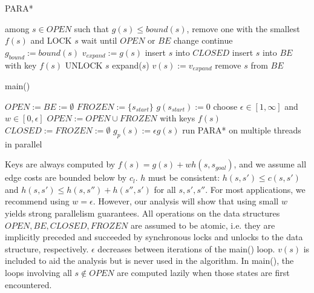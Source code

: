 \documentclass[letterpaper]{article}
\begin{document}
\begin{algorithm}
\caption{PARA*}
\label{alg:PARA*}
\begin{algorithmic}
\STATE among $s\in OPEN$ such that $g(s) \le bound(s)$, remove one with the smallest $f(s)$ and LOCK $s$
\STATE wait until $OPEN$ or $BE$ change
\STATE continue
\ENDIF
\STATE $g_{bound} := bound(s)$
\STATE $v_{expand} := g(s)$
\STATE insert $s$ into $CLOSED$
\STATE insert $s$ into $BE$ with key $f(s)$
\STATE UNLOCK $s$
\STATE expand($s$)
\STATE $v(s) := v_{expand}$
\STATE remove $s$ from $BE$
\ENDWHILE
\end{algorithmic}
\end{algorithm}

\begin{algorithm}
\caption{main()}
\label{alg:main}
\begin{algorithmic}
\STATE $OPEN := BE := \emptyset$
\STATE $FROZEN := \{s_{start}\}$
\STATE $g(s_{start}) := 0$
\REPEAT
\STATE choose $\epsilon \in [1,\infty]$ and $w \in [0,\epsilon]$
\STATE $OPEN := OPEN \cup FROZEN$ with keys $f(s)$
\STATE $CLOSED := FROZEN := \emptyset$
\STATE $g_p(s) := \epsilon g(s)$
\ENDFOR
\STATE run PARA* on multiple threads in parallel
\end{algorithmic}
\end{algorithm}

Keys are always computed by $f(s) = g(s) + wh(s,s_{goal})$, and we assume all edge costs are bounded below by $c_l$. $h$ must be consistent: $h(s,s') \le c(s,s')$ and $h(s,s') \le h(s,s'')+h(s'',s')$ for all $s,s',s''$. For most applications, we recommend using $w = \epsilon$. However, our analysis will show that using small $w$ yields strong parallelism guarantees. All operations on the data structures $OPEN,BE,CLOSED,FROZEN$ are assumed to be atomic, i.e. they are implicitly preceded and succeeded by synchronous locks and unlocks to the data structure, respectively. $\epsilon$ decreases between iterations of the main() loop. $v(s)$ is included to aid the analysis but is never used in the algorithm. In main(), the loops involving all $s\notin OPEN$ are computed lazily when those states are first encountered.
\end{document}
